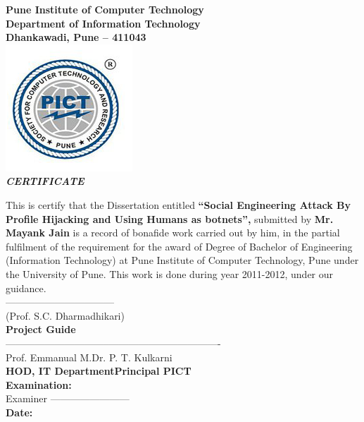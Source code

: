 \begin{center}
\thispagestyle{empty}

\LARGE{\textbf{Pune Institute of Computer Technology}} \\ 
\large{\textbf{Department of Information Technology}}\\
\large{\textbf{Dhankawadi, Pune – 411043}}\\[0.5cm]

\includegraphics[scale=0.5]{project/pict_logo}\\[0.5cm]

{\Huge \textbf{\emph{CERTIFICATE}}}\\[0.5cm]
\end{center}
\linespread{1.13}
\large{This is certify that the Dissertation entitled 
\textbf{``Social Engineering Attack By Profile Hijacking and Using Humans as botnets'',} 
submitted by 
\textbf{Mr. Mayank Jain}
 is a record of bonafide work carried out by him, in the partial
 fulfilment of the requirement for the award of Degree of Bachelor of
 Engineering (Information Technology) at Pune Institute of Computer
 Technology, Pune under the University of Pune. This work is done
 during year 2011-2012, under our guidance.}\\[1.0cm]
\large{---------------------------------}\\
\large{(Prof. S.C. Dharmadhikari)}\\[0.3cm]
\textbf{Project Guide}\\[1.0cm]
\large{--------------------------------}\hspace*{1.5in}\large{----------------------------------}\\
\large{Prof. Emmanual M.}\hspace*{2.0in}\large{Dr. P. T. Kulkarni}\\[0.3cm]
\textbf{HOD, IT Department}\hspace*{1.73in}\textbf{Principal PICT}\\[0.5cm]
\Large{\textbf{Examination:}}\\[0.8cm]
\large{Examiner ------------------------}\\[0.8cm]
\Large{\textbf{Date:}}
\newpage
